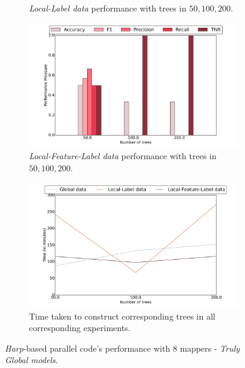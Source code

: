 \documentclass{sig-alternate-05-2015}
\begin{document}
\begin{figure}[t]
\begin{subfigure}{.4\textwidth}
\caption{\textit{Local-Label data} performance with trees in ${50,100,200}$.}
\end{subfigure}
\begin{subfigure}{.4\textwidth}
\centering
\includegraphics[scale=0.2]{figures/8Map-localFeatureLabelPerf.png}
\caption{\textit{Local-Feature-Label data} performance with trees in ${50,100,200}$.}
\end{subfigure}
\begin{subfigure}{.4\textwidth}
\centering
\includegraphics[scale=0.2]{figures/8MapperTime.png}
\caption{Time taken to construct corresponding trees in all corresponding experiments.}
\end{subfigure}
\caption{\textit{Harp}-based parallel code's performance with 8 mappers - \textit{Truly Global models}.}
\label{fig:trulyGlobalModels}
\end{figure}
\end{document}
